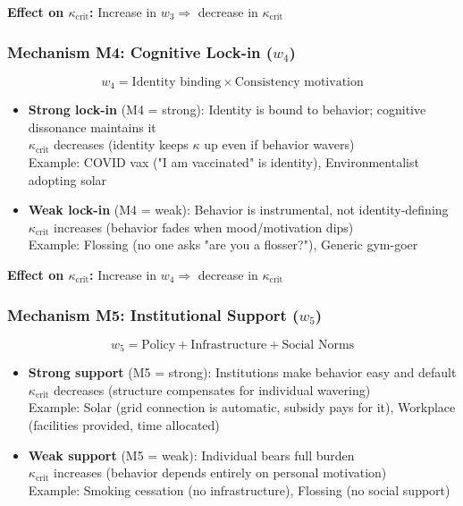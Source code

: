 \documentclass[11pt, a4paper]{article}
\begin{document}
\textbf{Effect on $\kappa_{\text{crit}}$:} Increase in $w_3 \Rightarrow$ decrease in $\kappa_{\text{crit}}$

\subsubsection{Mechanism M4: Cognitive Lock-in ($w_4$)}

\begin{equation}
w_4 = \text{Identity binding} \times \text{Consistency motivation}
\end{equation}

\begin{itemize}
    \item \textbf{Strong lock-in} (M4 = strong):
    Identity is bound to behavior; cognitive dissonance maintains it
    \\ $\kappa_{\text{crit}}$ decreases (identity keeps $\kappa$ up even if behavior wavers)
    \\ Example: COVID vax ("I am vaccinated" is identity), Environmentalist adopting solar

    \item \textbf{Weak lock-in} (M4 = weak):
    Behavior is instrumental, not identity-defining
    \\ $\kappa_{\text{crit}}$ increases (behavior fades when mood/motivation dips)
    \\ Example: Flossing (no one asks "are you a flosser?"), Generic gym-goer
\end{itemize}

\textbf{Effect on $\kappa_{\text{crit}}$:} Increase in $w_4 \Rightarrow$ decrease in $\kappa_{\text{crit}}$

\subsubsection{Mechanism M5: Institutional Support ($w_5$)}

\begin{equation}
w_5 = \text{Policy} + \text{Infrastructure} + \text{Social Norms}
\end{equation}

\begin{itemize}
    \item \textbf{Strong support} (M5 = strong):
    Institutions make behavior easy and default
    \\ $\kappa_{\text{crit}}$ decreases (structure compensates for individual wavering)
    \\ Example: Solar (grid connection is automatic, subsidy pays for it),
               Workplace (facilities provided, time allocated)

    \item \textbf{Weak support} (M5 = weak):
    Individual bears full burden
    \\ $\kappa_{\text{crit}}$ increases (behavior depends entirely on personal motivation)
    \\ Example: Smoking cessation (no infrastructure), Flossing (no social support)
\end{itemize}
\end{document}
